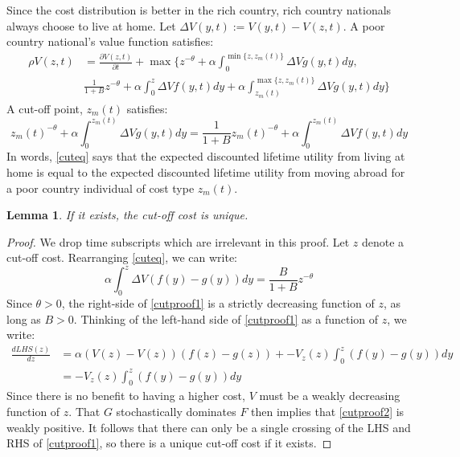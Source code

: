 \documentclass{article}
\newtheorem{lemma}[theorem]{Lemma}
\begin{document}
Since the cost distribution is better in the rich country, rich country nationals always choose to live at home.  
Let $\Delta V(y,t) := V(y,t)-V(z,t)$. 
A poor country national's value function satisfies:  
\begin{align}
  \label{valfun}
  \rho V(z,t) &= \frac{\partial V(z,t)}{\partial t} + \max\{z^{-\theta} +  \alpha \int_0^{\min \{z,z_m(t)\}} \Delta V g(y,t) dy, \nonumber  \\
  & \frac{1}{1+B} z^{-\theta}+ \alpha \int_0^z \Delta V f(y,t) dy + \alpha \int_{z_m(t)}^{\max \{z,z_m(t)\}}\Delta V g(y,t)dy \}
\end{align}
A cut-off point, $z_m(t)$ satisfies:
\begin{equation}
  \label{cuteq}
  z_m(t)^{-\theta} + \alpha \int_0^{z_m(t)} \Delta V g(y,t) dy = \frac{1}{1+B} z_m(t)^{-\theta} + \alpha \int_0^{z_m(t)} \Delta V f(y,t)dy
\end{equation}
In words, \eqref{cuteq} says that the expected discounted lifetime utility from living at home is equal to the expected discounted lifetime utility from moving abroad for a poor country individual of cost type $z_m(t)$.
\begin{lemma}
  \label{uniqcut}
 If it exists, the cut-off cost is unique. 
\end{lemma}
\begin{proof}
  We drop time subscripts which are irrelevant in this proof.
  Let $z$ denote a cut-off cost.
  Rearranging \eqref{cuteq}, we can write:
  \begin{equation}
    \label{cutproof1}
    \alpha \int_0^{z} \Delta V \left(f(y)-g(y)\right)dy = \frac{B}{1+B}z^{-\theta}
  \end{equation}
  Since $\theta > 0$, the right-side of \eqref{cutproof1} is a strictly decreasing function of $z$, as long as $B>0$.  
  Thinking of the left-hand side of \eqref{cutproof1} as a function of $z$, we write:
  \begin{align}
    \label{cutproof2}
    \frac{d LHS(z)}{d z} &= \alpha \left(V(z)-V(z)\right)\left(f(z)-g(z)\right) + -V_z(z) \int_0^z \left(f(y)-g(y)\right) dy \nonumber \\
    &= -V_z(z) \int_0^z \left(f(y)-g(y)\right) dy
  \end{align}
  Since there is no benefit to having a higher cost, $V$ must be a weakly decreasing function of $z$.  That $G$ stochastically dominates $F$ then implies that \eqref{cutproof2} is weakly positive.  It follows that there can only be a single crossing of the LHS and RHS of \eqref{cutproof1}, so there is a unique cut-off cost if it exists.
\end{proof}
\end{document}
